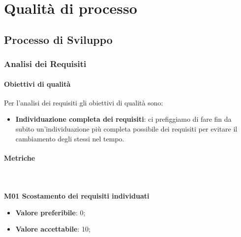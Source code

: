 \section{Qualità di processo}
												
	\subsection{Processo di Sviluppo}
		\subsubsection{Analisi dei Requisiti} 
			\paragraph{Obiettivi di qualità}
			Per l'analisi dei requisiti gli obiettivi di qualità sono:
			\begin{itemize}
				\item \textbf{Individuazione completa dei requisiti}: ci prefiggiamo di fare fin da subito un'individuazione più completa possibile dei requisiti per evitare il cambiamento degli stessi nel tempo.
			\end{itemize}
			\paragraph{Metriche} \mbox{} \\ \\
				\textbf{M01 Scostamento dei requisiti individuati} 
				\begin{itemize}
					\item \textbf{Valore preferibile}: 0;
					\item \textbf{Valore accettabile}: 10;
				\end{itemize}
			
